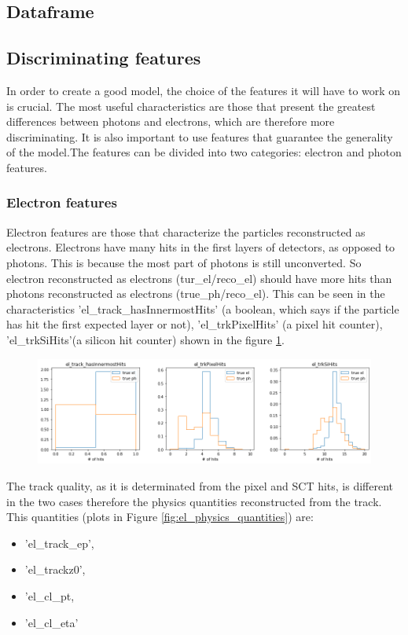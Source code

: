 \documentclass[a4paper, oneside]{book}
\begin{document}
			\subsection{Dataframe}
			
			\subsection{Discriminating features}
				In order to create a good model, the choice of the features it will have to work on is crucial. The most useful characteristics are those that present the greatest differences between photons and electrons, which are therefore more discriminating. It is also important to use features that guarantee the generality of the model.The features can be divided into two categories: electron and photon features.
				\subsubsection{Electron features}
				Electron features are those that characterize the particles reconstructed as electrons. Electrons have many hits in the first layers of detectors, as opposed to photons. This is because the most part of photons is still unconverted. So electron reconstructed as electrons (tur\_el/reco\_el) should have more hits than photons reconstructed as electrons (true\_ph/reco\_el). This can be seen in the characteristics 'el\_track\_hasInnermostHits' (a boolean, which says if the particle has hit the first expected layer or not), 'el\_trkPixelHits' (a pixel hit counter), 'el\_trkSiHits'(a silicon hit counter) shown in the figure \ref{fig:el_hit}.
				\begin{figure}
					\centering
					\includegraphics[width=0.7\textheight]{tesi_images/el_hit.png}
					\caption{}
					\label{fig:el_hit}
				\end{figure}
				
				The track quality, as it is determinated from the pixel and SCT hits, is different in the two cases therefore the physics quantities reconstructed from the track. This quantities (plots in Figure \ref{fig:el_physics_quantities}) are:
				\begin{itemize}
					\item 'el\_track\_ep',
					\item 'el\_trackz0',
					\item 'el\_cl\_pt, 
					\item 'el\_cl\_eta'
				\end{itemize}
			
\end{document}
